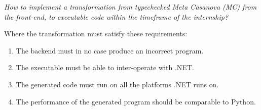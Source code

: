 \textit{How to implement a transformation from typechecked Meta Casanova (MC) from the front-end, to executable code within the timeframe of the internship?}

Where the transformation must satisfy these requirements:
\begin{enumerate}
    \item The backend must in no case produce an incorrect program.
    \item The executable must be able to inter-operate with .NET.
    \item The generated code must run on all the platforms .NET runs on.
    \item The performance of the generated program should be comparable to Python.
\end{enumerate}
